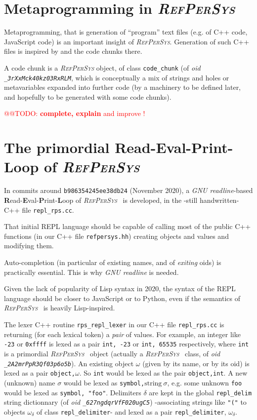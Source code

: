 \documentclass[11pt,a4paper,svgnames]{article}
\newcommand{\RefPerSys}{{\textit{\textsc{RefPerSys}}}}
\begin{document}
\section{Metaprogramming in \RefPerSys}

Metaprogramming, that is generation of ``program'' text files (e.g. of
C++ code, JavaScript code) is an important insight of
\RefPerSys. Generation of such C++ files is inspired by
\cite{Starynkevitch-DSL2011} and the code chunks there.

A code chunk is a {\RefPerSys} object, of class \texttt{code\_chunk}
(of \textit{oid \texttt{\_3rXxMck40kz03RxRLM}}, which is conceptually
a mix of strings and holes or metavariables expanded into further code
(by a machinery to be defined later, and hopefully to be generated
with some code chunks).

{\textcolor{red}{@@TODO: \textbf{complete, explain} and improve !}} 

\section{The primordial Read-Eval-Print-Loop of \RefPerSys}

In commits around \texttt{b986354245ee38db24} (November 2020), a
\textit{GNU readline}-based \textbf{R}ead-\textbf{E}val-\textbf{P}rint-\textbf{L}oop of \RefPerSys~ is
developed, in the -still handwritten- C++ file  \texttt{repl\_rps.cc}.

That initial REPL language should be capable of calling most of the public C++
functions (in our C++ file \texttt{refpersys.hh}) creating objects and
values and modifying them.

Auto-completion (in particular of existing names, and of
\textit{exiting} oids) is practically essential. This is why
\textit{GNU readline} is needed.

Given the lack of popularity of Lisp syntax in 2020, the syntax of the
REPL language should be closer to JavaScript or to Python, even if the
semantics of \RefPerSys~ is heavily Lisp-inspired.

The lexer C++ routine \texttt{rps\_repl\_lexer} in our C++ file
\texttt{repl\_rps.cc} is returning (for each lexical token) a
\textit{pair} of values. For example, an integer like \texttt{-23} or
\texttt{0xffff} is lexed as a pair \texttt{int, -23} or \texttt{int,
  65535} respectively, where \texttt{int} is a primordial \RefPerSys~
object (actually a \RefPerSys~ class, of \textit{oid
  \texttt{\_2A2mrPpR3Qf03p6o5b}}). An existing object $\omega$ (given
by its name, or by its oid) is lexed as a pair
\texttt{object,}$\omega$. So \texttt{int} would be lexed as the pair
\texttt{object,int}.  A new (unknown) name $\sigma$ would be lexed as
\texttt{symbol,}$\mathrm{string}~ \sigma$, e.g. some unknown
\texttt{foo} would be lexed as \texttt{symbol, "foo"}. Delimiters
$\delta$ are kept in the global \texttt{repl\_delim} string
dictionnary (of \textit{oid \texttt{\_627ngdqrVfF020ugC5}})
-associating strings like \texttt{"("} to objects $\omega_{\delta}$ of
class \texttt{repl\_delimiter}- and lexed as a pair
\texttt{repl\_delimiter}, $\omega_{\delta}$.

\clearpage
\printnoidxglossaries
\bigskip
\printbibliography
\bigskip
\printindex
\end{document}
